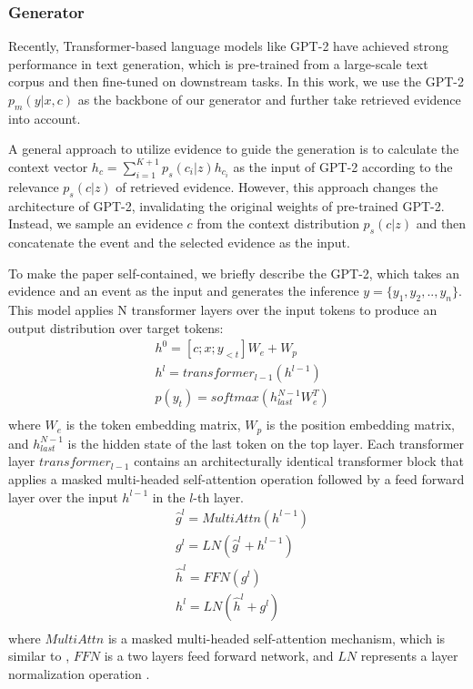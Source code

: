\documentclass[11pt,a4paper]{article}
\begin{document}
\subsubsection{Generator}
Recently, Transformer-based \cite{vaswani2017attention} language models like GPT-2 \cite{radford2019language} have achieved strong performance in text generation, which is pre-trained from a large-scale text corpus and then fine-tuned on downstream tasks. In this work, we use the GPT-2 $p_m(y|x,c)$ as the backbone of our generator and further take retrieved evidence into account. 

A general approach to utilize evidence to guide the generation is to calculate the context vector $h_c=\sum_{i=1}^{K+1}p_s(c_i|z)h_{c_i}$ as the input of GPT-2 according to the relevance $p_s(c|z)$ of retrieved evidence.
However, this approach changes the architecture of GPT-2, invalidating the original weights of pre-trained GPT-2.
Instead, we sample an evidence $c$ from the context distribution $p_s(c|z)$ and then concatenate the event and the selected evidence as the input. 

To make the paper self-contained, we briefly describe the GPT-2, which takes an evidence and an event as the input and generates the inference $y=\{y_1,y_2,..,y_n\}$. 
This model applies N transformer layers over the input tokens to produce an output distribution over target tokens:
\begin{equation}
\begin{split}
&h^0=[c;x;y_{<t}]W_e+W_p \\
&h^l=transformer_{l-1}(h^{l-1})\\
&p(y_t)=softmax(h^{N-1}_{last}W^T_e) \\
\end{split}
\end{equation}
where $W_e$ is the token embedding matrix, $W_p$ is the position embedding matrix, and $h^{N-1}_{last}$ is the hidden state of the last token on the top layer. Each transformer layer $transformer_{l-1}$ contains an architecturally identical transformer block that applies a masked multi-headed self-attention operation followed by a feed forward layer over the input $h^{l-1}$ in the $l$-th layer.  
\begin{equation}\label{equa:transformer-block}
\begin{split}
&\hat{g}^l=MultiAttn(h^{l-1}) \\
&{g}^l=LN(\hat{g}^l+h^{l-1})\\
&\hat{h}^l=FFN({g}^l)\\
&h^l=LN(\hat{h}^l+{g}^l)\\
\end{split}
\end{equation}
where $MultiAttn$ is a masked multi-headed self-attention mechanism, which is similar to \citet{vaswani2017attention}, $FFN$ is a two layers feed forward network, and $LN$ represents a layer normalization operation \cite{ba2016layer}. 
\end{document}
